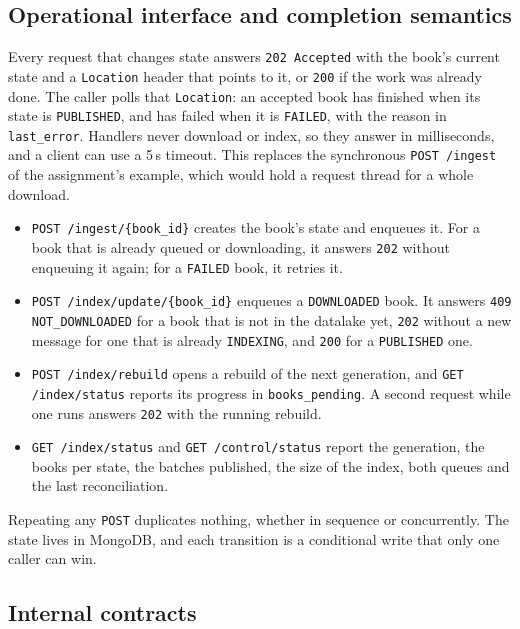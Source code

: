 \documentclass[11pt,a4paper]{article}
\newcommand{\code}[1]{\nolinkurl{#1}}
\begin{document}
\subsection{Operational interface and completion semantics}
\label{sec:async}

Every request that changes state answers \code{202 Accepted} with the book's current state and a \code{Location}
header that points to it, or \code{200} if the work was already done. The caller polls that \code{Location}: an
accepted book has finished when its state is \code{PUBLISHED}, and has failed when it is \code{FAILED}, with the reason
in \code{last_error}. Handlers never download or index, so they answer in milliseconds, and a client can use a 5\,s
timeout. This replaces the synchronous \code{POST /ingest} of the assignment's example, which would hold a request
thread for a whole download.

\begin{itemize}
\item \code{POST /ingest/{book_id}} creates the book's state and enqueues it. For a book that is already queued or
  downloading, it answers \code{202} without enqueuing it again; for a \code{FAILED} book, it retries it.
\item \code{POST /index/update/{book_id}} enqueues a \code{DOWNLOADED} book. It answers \code{409 NOT_DOWNLOADED} for a
  book that is not in the datalake yet, \code{202} without a new message for one that is already \code{INDEXING}, and
  \code{200} for a \code{PUBLISHED} one.
\item \code{POST /index/rebuild} opens a rebuild of the next generation, and \code{GET /index/status} reports its
  progress in \code{books_pending}. A second request while one runs answers \code{202} with the running rebuild.
\item \code{GET /index/status} and \code{GET /control/status} report the generation, the books per state, the batches
  published, the size of the index, both queues and the last reconciliation.
\end{itemize}

Repeating any \code{POST} duplicates nothing, whether in sequence or concurrently. The state lives in MongoDB, and each
transition is a conditional write that only one caller can win.

\subsection{Internal contracts}
\label{sec:internal}
\end{document}
